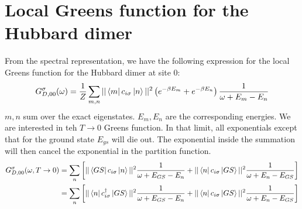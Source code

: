 \documentclass[prb]{revtex4-2}
\begin{document}
\section{Local Greens function for the Hubbard dimer}
From the spectral representation, we have the following expression for the local Greens function for the Hubbard dimer at site $0$:
\begin{equation}\begin{aligned}
	G_{D,00}^\sigma(\omega) = \frac{1}{Z}\sum_{m,n}||\bra{m}c_{i\sigma}\ket{n}||^2\left( e^{-\beta E_m} + e^{-\beta E_n}\right)\frac{1}{\omega + E_m - E_n}
\end{aligned}\end{equation}
$m,n$ sum over the exact eigenstates. $E_m, E_n$ are the corresponding energies. We are interested in teh $T \to 0$ Greens function. In that limit, all exponentials except that for the ground state $E_{gs}$ will die out. The exponential inside the summation will then cancel the exponential in the partition function.
\begin{equation}\begin{aligned}
	G_{D,00}^\sigma(\omega, T \to 0) &= \sum_{n}\left[||\bra{GS}c_{i\sigma}\ket{n}||^2\frac{1}{\omega + E_{GS} - E_n} + ||\bra{n}c_{i\sigma}\ket{GS}||^2\frac{1}{\omega + E_n - E_{GS}}\right]\\
					&= \sum_{n}\left[||\bra{n}c^\dagger_{i\sigma}\ket{GS}||^2\frac{1}{\omega + E_{GS} - E_n} + ||\bra{n}c_{i\sigma}\ket{GS}||^2\frac{1}{\omega + E_n - E_{GS}}\right]\\
\end{aligned}\end{equation}
\end{document}
